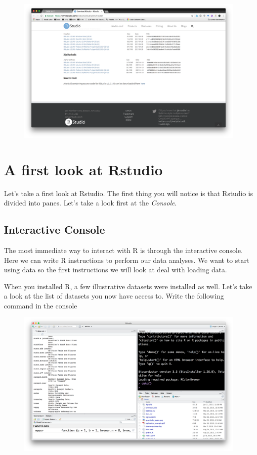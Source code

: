 \documentclass[]{book}
\theoremstyle{definition}
\theoremstyle{definition}
\theoremstyle{remark}
\begin{document}
\begin{figure}
\centering
\includegraphics{img/rstudio.png}
\caption{}
\end{figure}

\section{A first look at Rstudio}\label{a-first-look-at-rstudio}

Let's take a first look at Rstudio. The first thing you will notice is
that Rstudio is divided into panes. Let's take a look first at the
\emph{Console}.

\subsection{Interactive Console}\label{interactive-console}

The most immediate way to interact with R is through the interactive
console. Here we can write R instructions to perform our data analyses.
We want to start using data so the first instructions we will look at
deal with loading data.

When you installed R, a few illustrative datasets were installed as
well. Let's take a look at the list of datasets you now have access to.
Write the following command in the console

\begin{figure}
\centering
\includegraphics{img/rstudio_data.png}
\caption{}
\end{figure}
\end{document}
